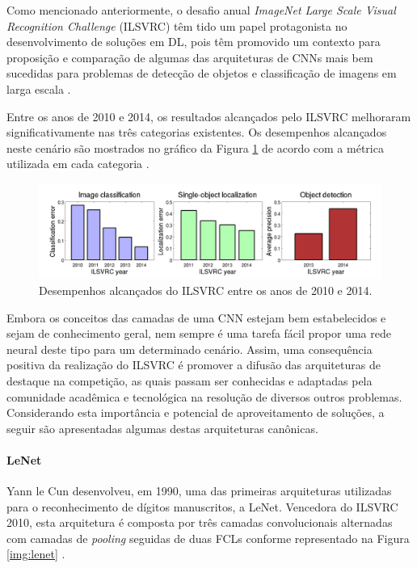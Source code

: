 Como mencionado anteriormente, o desafio anual \emph{ImageNet Large Scale Visual Recognition Challenge} (ILSVRC) têm tido um papel protagonista no desenvolvimento de soluções em DL, pois têm promovido um contexto para proposição e comparação de algumas das arquiteturas de CNNs mais bem sucedidas para problemas de detecção de objetos e classificação de imagens em larga escala \cite{ILSVRC}.

Entre os anos de 2010 e 2014, os resultados alcançados pelo ILSVRC melhoraram significativamente nas três categorias existentes. Os desempenhos alcançados neste cenário são mostrados no gráfico da Figura \ref{fig:ilsvrc} de acordo com a métrica utilizada em cada categoria \cite{ILSVRC}.   

\begin{figure}[h]
	\centering
	\caption{Desempenhos alcançados do ILSVRC entre os anos de 2010 e 2014.}
	\label{fig:ilsvrc}
	\includegraphics[width=1\textwidth]{./img/ilsvrc}
\end{figure}

Embora os conceitos das camadas de uma CNN estejam bem estabelecidos e sejam de conhecimento geral, nem sempre é uma tarefa fácil propor uma rede neural deste tipo para um determinado cenário. Assim, uma consequência positiva da realização do ILSVRC é promover a difusão das arquiteturas de destaque na competição, as quais passam ser conhecidas e adaptadas pela comunidade acadêmica e tecnológica na resolução de diversos outros problemas. Considerando esta importância e potencial de aproveitamento de soluções, a seguir são apresentadas algumas destas arquiteturas canônicas.


\paragraph{LeNet} Yann le Cun desenvolveu, em 1990, uma das primeiras arquiteturas utilizadas para o reconhecimento de dígitos manuscritos, a LeNet. Vencedora do ILSVRC 2010, esta arquitetura é composta por três camadas convolucionais alternadas com camadas de \textit{pooling} seguidas de duas FCLs conforme representado na Figura \ref{img:lenet} \cite{ref:sewak,ref:khan}.

